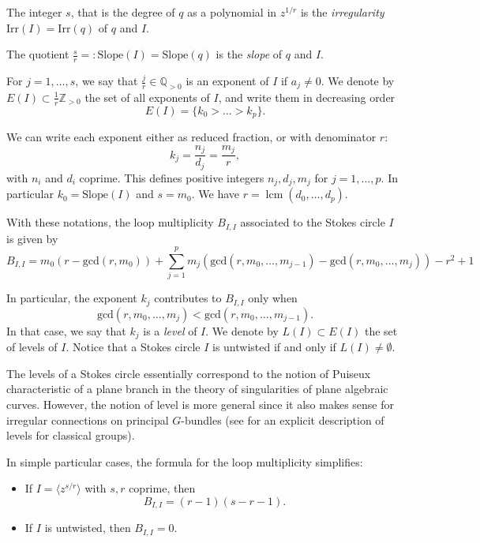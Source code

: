 \documentclass[11pt,a4paper]{amsart}
\numberwithin{equation}{section}
\DeclareMathOperator{\lcm}{lcm}
\newcommand{\cir}[1]{\langle #1 \rangle}
\begin{document}
The integer $s$, that is the degree of $q$ as a polynomial in $z^{1/r}$ is the \emph{irregularity} $\mathrm{Irr}(I)=\mathrm{Irr}(q)$ of $q$ and $I$. 

The quotient $\frac{s}{r}=:\mathrm{Slope}(I)=\mathrm{Slope}(q)$ is the \emph{slope} of $q$ and $I$.

For $j=1, \dots, s$, we say that $\frac{j}{r}\in \mathbb Q_{>0}$ is an exponent of $I$ if $a_j\neq 0$. We denote by $E(I)\subset \frac{1}{r}\mathbb Z_{>0}$ the set of all exponents of $I$, and write them in decreasing order
\[
E(I)=\{k_0>\dots > k_p\}.
\]

We can write each exponent either as reduced fraction, or with denominator $r$:
\[
k_j=\frac{n_j}{d_j}=\frac{m_j}{r},
\]
with $n_i$ and $d_i$ coprime. This defines positive integers $n_j,d_j, m_j$ for $j=1, \dots, p$. In particular $k_0=\mathrm{Slope}(I)$ and $s=m_0$. We have $r=\lcm(d_0, \dots, d_p)$.


\begin{lemma}
\label{lemma:formula_loop_multiplicities}
With these notations, the loop multiplicity $B_{I,I}$ associated to the Stokes circle $I$ is given by
\[
B_{I,I}=m_0(r-\mathrm{gcd}(r, m_0))+ \sum_{j=1}^p  m_j\left(\mathrm{gcd}(r, m_0, \dots, m_{j-1})-\mathrm{gcd}(r, m_0,\dots,m_j)\right)-r^2+1
\]
\end{lemma}

\begin{remark} In particular, the exponent $k_j$ contributes to $B_{I,I}$ only when 
\[
\mathrm{gcd}(r, m_0,\dots,m_j)<\mathrm{gcd}(r, m_0,\dots,m_{j-1}).
\]
In that case, we say that $k_j$ is a \emph{level} of $I$. We denote by $L(I)\subset E(I)$ the set of levels of $I$. Notice that a Stokes circle $I$ is untwisted if and only if $L(I)\neq\emptyset$.

The levels of a Stokes circle essentially correspond to the notion of Puiseux characteristic of a plane branch in the theory of  singularities of plane algebraic curves. However, the notion of level is more general since it also makes sense for irregular connections on principal $G$-bundles (see \cite{doucot2025twisted} for an explicit description of levels for classical groups).
\end{remark}


\begin{remark}
In simple particular cases, the formula for the loop multiplicity simplifies:
\begin{itemize}
\item If $I=\cir{z^{s/r}}$ with $s,r$ coprime, then
\begin{equation}
B_{I,I}=(r-1)(s-r-1).
\end{equation}
\item If $I$ is untwisted, then $B_{I,I}=0$.
\end{itemize}
\end{remark}
\end{document}
